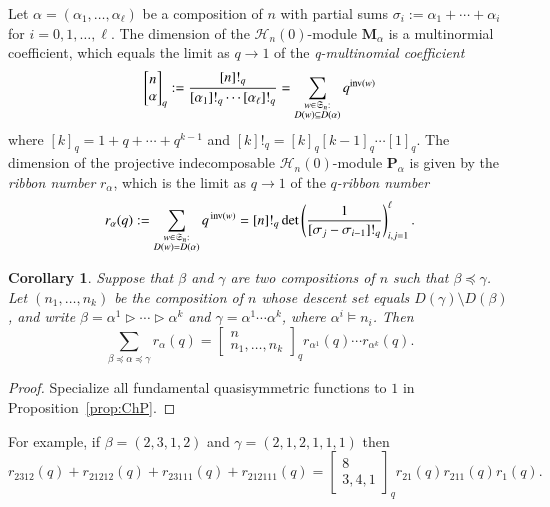 \documentclass{amsart}
\newtheorem{corollary}[theorem]{Corollary}
\newtheorem*{Young's Rule}{Young's Rule}
\theoremstyle{definition}
\theoremstyle{remark}
\numberwithin{equation}{section}
\begin{document}
Let $\alpha=(\alpha_1,\ldots,\alpha_\ell)$ be a composition of $n$ with partial sums $\sigma_i:=\alpha_1+\cdots+\alpha_i$ for $i=0,1,\ldots,\ell$. The dimension of the ${\mathcal{H}}_n(0)$-module ${\mathbf{M}}_\alpha$ is a multinormial coefficient, which equals the limit as $q\to 1$ of the \emph{q-multinomial coefficient}
\[ {\left[\begin{matrix} {n} \\ {\alpha} \end{matrix} \right]_{{q}}} := \frac{[n]!_q}{[\alpha_1]!_q\cdots[\alpha_\ell]!_q} = \sum_{\substack{ w\in{{\mathfrak S}}_n: \\ D(w)\subseteq D(\alpha) }} q^{{{\rm inv}}(w)} \]
where $[k]_q=1+q+\cdots+q^{k-1}$ and $[k]!_q=[k]_q[k-1]_q\cdots [1]_q$. 
The dimension of the projective indecomposable ${\mathcal{H}}_n(0)$-module ${\mathbf{P}}_\alpha$ is given by the \emph{ribbon number} $r_\alpha$, which is the limit as $q\to1$ of the \emph{$q$-ribbon number}
\[ r_\alpha (q):=\sum_{\substack{ w\in\mathfrak S_n: \\ D(w)=D(\alpha) } } q^{\,{\rm inv}(w)}
=[n]!_q\det\left(\frac1{[\sigma_j-\sigma_{i-1}]!_q}\right)_{i,j=1}^\ell. \]

\begin{corollary}\label{cor:ChP}
Suppose that $\beta$ and $\gamma$ are two compositions of $n$ such that $\beta{\operatorname{\preccurlyeq}} \gamma$. Let $(n_1,\ldots,n_k)$ be the composition of $n$ whose descent set equals $D(\gamma)\setminus D(\beta)$, and write $\beta = \alpha^1\rhd\cdots\rhd \alpha^k$ and $\gamma = \alpha^1\cdots\alpha^k$, where $\alpha^i\models n_i$. Then 
\[  \sum_{ \beta{\operatorname{\preccurlyeq}}\alpha{\operatorname{\preccurlyeq}}\gamma } r_\alpha(q) = {\left[\begin{matrix} {n} \\ {n_1,\ldots,n_k} \end{matrix} \right]_{{q}}}r_{\alpha^1}(q)\cdots r_{\alpha^k}(q). \]
\end{corollary}

\begin{proof}
Specialize all fundamental quasisymmetric functions to $1$ in Proposition~\ref{prop:ChP}.
\end{proof}

For example, if $\beta = (2,3,1,2)$ and $\gamma=(2,1,2,1,1,1)$ then 
\[ r_{2312}(q) + r_{21212}(q) + r_{23111}(q) + r_{212111}(q) = {\left[\begin{matrix} {8} \\ {3,4,1} \end{matrix} \right]_{{q}}} r_{21}(q) r_{211}(q) r_1(q). \]
\end{document}

